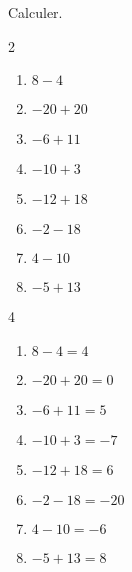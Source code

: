 \begin{exercice*}
    Calculer.
    \begin{multicols}2
        \begin{enumerate}
            \item $ 8-4 $
            \item $ -20+20 $
            \item $ -6+11 $
            \item $ -10+3 $
            \item $ -12+18 $
            \item $ -2-18 $
            \item $ 4-10 $
            \item $ -5+13 $
        \end{enumerate}
    \end{multicols}

\end{exercice*}
\begin{corrige}
    \phantom{rrr}    
    \begin{multicols}4
        \begin{enumerate}
            \item $ 8-4 = 4 $
            \item $ -20+20 = 0 $
            \item $ -6+11 = 5 $
            \item $ -10+3 = -7 $
            \item $ -12+18 = 6 $
            \item $ -2-18 = -20 $
            \item $ 4-10 = -6 $
            \item $ -5+13 = 8 $
        \end{enumerate}
    \end{multicols}
\end{corrige}